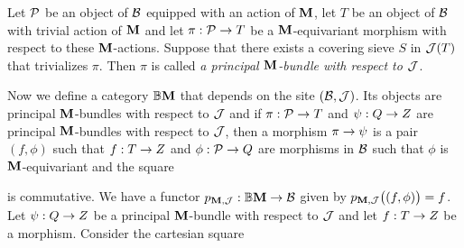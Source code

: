 \begin{definition}
Let ${\mathcal P}$ be an object of ${\mathcal B}$ equipped with an action of $\mathbf{M}$, let $T$ be an object of ${\mathcal B}$ with trivial action of $\mathbf{M}$ and let $\pi:{\mathcal P} \rightarrow T$ be a $\mathbf{M}$-equivariant morphism with respect to these $\mathbf{M}$-actions. Suppose that there exists a covering sieve $S$ in ${\mathcal J}(T)$ that trivializes $\pi$. Then $\pi$ is called \textit{a principal $\mathbf{M}$-bundle with respect to ${\mathcal J}$}.
\end{definition}
\noindent
Now we define a category $\mathbb{B}\mathbf{M}$ that depends on the site $({\mathcal B},{\mathcal J})$. Its objects are principal $\mathbf{M}$-bundles with respect to ${\mathcal J}$ and if $\pi:{\mathcal P}\rightarrow T$ and $\psi:Q \rightarrow Z$ are principal $\mathbf{M}$-bundles with respect to ${\mathcal J}$, then a morphism $\pi\rightarrow \psi$ is a pair $(f,\phi)$ such that $f:T\rightarrow Z$ and $\phi:{\mathcal P}\rightarrow Q$ are morphisms in ${\mathcal B}$ such that $\phi$ is $\mathbf{M}$-equivariant and the square
\begin{center}
\end{center}
is commutative. We have a functor $p_{\mathbf{M},{\mathcal J}}:\mathbb{B}\mathbf{M}\rightarrow {\mathcal B}$ given by $p_{\mathbf{M},{\mathcal J}}\big((f,\phi)\big) = f$. Let $\psi:Q\rightarrow Z$ be a principal $\mathbf{M}$-bundle with respect to ${\mathcal J}$ and let $f:T\rightarrow Z$ be a morphism. Consider the cartesian square
\begin{center}
\end{center}
